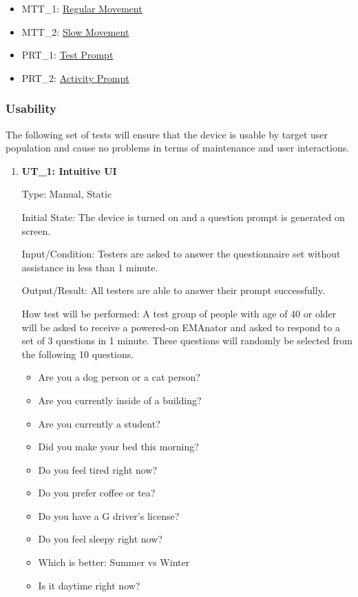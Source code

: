 \documentclass[12pt, titlepage]{article}
\begin{document}
\begin{itemize}
\item MTT\_1: \hyperref[MTT1]{Regular Movement}
\item MTT\_2: \hyperref[MTT2]{Slow Movement}
\item PRT\_1: \hyperref[PRT1]{Test Prompt}
\item PRT\_2: \hyperref[PRT2]{Activity Prompt}
\end{itemize}

\subsubsection{Usability}
The following set of tests will ensure that the device is usable by target user population and cause no problems in terms of maintenance and user interactions.		
\begin{enumerate}

\item\textbf{{UT\_1: Intuitive UI\\}}\label{UT1}

Type: Manual, Static
					
Initial State: The device is turned on and a question prompt is generated on screen.
					
Input/Condition: Testers are asked to answer the questionnaire set without assistance in less than 1 minute.
					
Output/Result: All testers are able to answer their prompt successfully.
					
How test will be performed: A test group of people with age of 40 or older will be asked to receive a powered-on EMAnator and asked to respond to a set of 3 questions in 1 minute. These questions will randomly be selected from the following 10 questions.

\begin{itemize}
\item Are you a dog person or a cat person?
\item Are you currently inside of a building?
\item Are you currently a student?
\item Did you make your bed this morning?
\item Do you feel tired right now?
\item Do you prefer coffee or tea?
\item Do you have a G driver's license?
\item Do you feel sleepy right now?
\item Which is better: Summer vs Winter
\item Is it daytime right now?
\end{itemize}
					

\end{enumerate}
\end{document}
